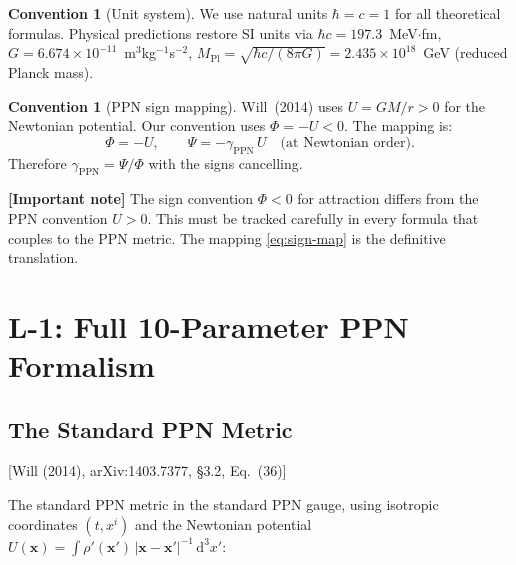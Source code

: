 \documentclass[11pt,a4paper]{article}
\theoremstyle{plain}
\theoremstyle{definition}
\newtheorem{convention}[theorem]{Convention}
\theoremstyle{remark}
\newcommand{\dd}{\mathrm{d}}
\newcommand{\fromlit}[1]{\textcolor{sctblue}{\textsf{[#1]}}}
\newcommand{\signcorrection}[1]{%
  \par\smallskip\noindent
  \colorbox{red!10}{\parbox{\dimexpr\linewidth-2\fboxsep}{%
    \textcolor{red!60!black}{\textbf{[Important note]}} #1}}%
  \par\smallskip}
\begin{document}
\begin{convention}[Unit system]\label{conv:units}
We use natural units $\hbar = c = 1$ for all theoretical formulas.
Physical predictions restore SI units via $\hbar c = 197.3$~MeV$\cdot$fm,
$G = 6.674 \times 10^{-11}$~m$^3$kg$^{-1}$s$^{-2}$,
$M_{\mathrm{Pl}} = \sqrt{\hbar c / (8\pi G)} = 2.435 \times 10^{18}$~GeV
(reduced Planck mass).
\end{convention}

\begin{convention}[PPN sign mapping]\label{conv:ppn-sign}
Will~(2014) uses $U = GM/r > 0$ for the Newtonian potential.
Our convention uses $\Phi = -U < 0$.  The mapping is:
\begin{equation}\label{eq:sign-map}
  \Phi = -U, \qquad
  \Psi = -\gamma_{\mathrm{PPN}}\, U \quad\text{(at Newtonian order)}.
\end{equation}
Therefore $\gamma_{\mathrm{PPN}} = \Psi/\Phi$ with the signs cancelling.
\end{convention}

\signcorrection{The sign convention $\Phi < 0$ for attraction
differs from the PPN convention $U > 0$.  This must be tracked
carefully in every formula that couples to the PPN metric.
The mapping \eqref{eq:sign-map} is the definitive translation.}


\section{L-1: Full 10-Parameter PPN Formalism}\label{sec:ppn}

\subsection{The Standard PPN Metric}

\fromlit{Will (2014), arXiv:1403.7377, \S3.2, Eq.~(36)}

The standard PPN metric in the standard PPN gauge, using
isotropic coordinates $(t, x^i)$ and the Newtonian potential
$U(\mathbf{x}) = \int \rho'(\mathbf{x}')\,|\mathbf{x} -
\mathbf{x}'|^{-1}\,\dd^3 x'$:
\end{document}
